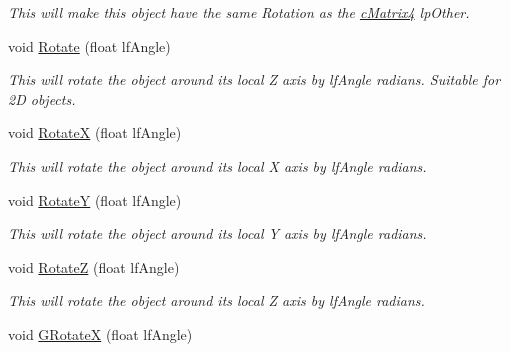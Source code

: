 \begin{DoxyCompactItemize}
\begin{DoxyCompactList}\small\item\em This will make this object have the same Rotation as the \hyperlink{classc_matrix4}{cMatrix4} lpOther. \end{DoxyCompactList}\item 
\hypertarget{classc_matrix4_ab21d0553250b8ca4b0388105afc79478}{
void \hyperlink{classc_matrix4_ab21d0553250b8ca4b0388105afc79478}{Rotate} (float lfAngle)}
\label{classc_matrix4_ab21d0553250b8ca4b0388105afc79478}

\begin{DoxyCompactList}\small\item\em This will rotate the object around its local Z axis by lfAngle radians. Suitable for 2D objects. \end{DoxyCompactList}\item 
\hypertarget{classc_matrix4_af3c238c3d65276912b3071c33c9a8e59}{
void \hyperlink{classc_matrix4_af3c238c3d65276912b3071c33c9a8e59}{RotateX} (float lfAngle)}
\label{classc_matrix4_af3c238c3d65276912b3071c33c9a8e59}

\begin{DoxyCompactList}\small\item\em This will rotate the object around its local X axis by lfAngle radians. \end{DoxyCompactList}\item 
\hypertarget{classc_matrix4_ac625c531c3644462cc91ed53bef5e1e9}{
void \hyperlink{classc_matrix4_ac625c531c3644462cc91ed53bef5e1e9}{RotateY} (float lfAngle)}
\label{classc_matrix4_ac625c531c3644462cc91ed53bef5e1e9}

\begin{DoxyCompactList}\small\item\em This will rotate the object around its local Y axis by lfAngle radians. \end{DoxyCompactList}\item 
\hypertarget{classc_matrix4_a784f4dd7106e393b654d17ff78cc49a7}{
void \hyperlink{classc_matrix4_a784f4dd7106e393b654d17ff78cc49a7}{RotateZ} (float lfAngle)}
\label{classc_matrix4_a784f4dd7106e393b654d17ff78cc49a7}

\begin{DoxyCompactList}\small\item\em This will rotate the object around its local Z axis by lfAngle radians. \end{DoxyCompactList}\item 
\hypertarget{classc_matrix4_a0be08400d130f819bbedbb35f551d4c7}{
void \hyperlink{classc_matrix4_a0be08400d130f819bbedbb35f551d4c7}{GRotateX} (float lfAngle)}
\label{classc_matrix4_a0be08400d130f819bbedbb35f551d4c7}


\end{DoxyCompactItemize}
